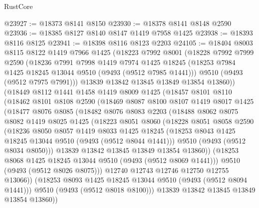 \begin{lexlean}{RustCore}
\begin{coremodule}
@23927 := @18373 @8141 @8150
@23930 := @18378 @8141 @8148 @2590
@23936 := @18385 @8127 @8140 @8147 @1419 @7958 @1425
@23938 := @18393 @8116 @8125
@23941 := @18398 @8116 @8123 @2203
@24105 := @18404
    @8003
    @8115
    @8122
    @1419
    @7966
    @1425
    (@18223
      @7992
      @8001
      (@18228
        @7992
        @7999
        @2590
        (@18236
          @7991
          @7998
          @1419
          @7974
          @1425
          @18245
          (@18253 @7984 @1425 @18245 @13044 @9510 (@9493 (@9512 @7985 @1441)))
          @9510
          (@9493 (@9512 @7975 @7991)))
        @13839
        @13842
        @13845
        @13849
        @13854
        @13860))
    (@18449
      @8112
      @1441
      @1458
      @1419
      @8009
      @1425
      (@18457
        @8101
        @8110
        (@18462
          @8101
          @8108
          @2590
          (@18469
            @8087
            @8100
            @8107
            @1419
            @8017
            @1425
            (@18477
              @8076
              @8085
              (@18482
                @8076
                @8083
                @2203
                (@18488
                  @8062
                  @8075
                  @8082
                  @1419
                  @8025
                  @1425
                  (@18223
                    @8051
                    @8060
                    (@18228
                      @8051
                      @8058
                      @2590
                      (@18236
                        @8050
                        @8057
                        @1419
                        @8033
                        @1425
                        @18245
                        (@18253 @8043 @1425 @18245 @13044 @9510 (@9493 (@9512 @8044 @1441)))
                        @9510
                        (@9493 (@9512 @8034 @8050)))
                      @13839
                      @13842
                      @13845
                      @13849
                      @13854
                      @13860))
                  (@18253 @8068 @1425 @18245 @13044 @9510 (@9493 (@9512 @8069 @1441)))
                  @9510
                  (@9493 (@9512 @8026 @8075)))
                @12740
                @12743
                @12746
                @12750
                @12755
                @13066))
            (@18253 @8093 @1425 @18245 @13044 @9510 (@9493 (@9512 @8094 @1441)))
            @9510
            (@9493 (@9512 @8018 @8100)))
          @13839
          @13842
          @13845
          @13849
          @13854
          @13860))

\end{coremodule}
\end{lexlean}
